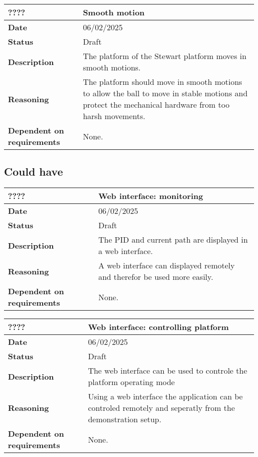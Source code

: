 \documentclass{article}
\begin{document}
\begin{table}[H]
    \renewcommand{\arraystretch}{1.3}
    \begin{tabular}{|l|p{10cm}|}
        \hline
        \rowcolor{gray!50}
        \textbf{????} & \textbf{Smooth motion} \\ \hline
        \textbf{Date} & 06/02/2025 \\ \hline
        \textbf{Status} & Draft \\ \hline
        \textbf{Description} & The platform of the Stewart platform moves in smooth motions. \\ \hline
        \textbf{Reasoning} & The platform should move in smooth motions to allow the ball to move in stable motions and protect the mechanical hardware from too harsh movements. \\ \hline
        \textbf{Dependent on requirements} & None. \\ \hline
    \end{tabular}
\end{table}

\subsection{Could have}

\begin{table}[H]
    \renewcommand{\arraystretch}{1.3}
    \begin{tabular}{|l|p{10cm}|}
        \hline
        \rowcolor{gray!50}
        \textbf{????} & \textbf{Web interface: monitoring} \\ \hline
        \textbf{Date} & 06/02/2025 \\ \hline
        \textbf{Status} & Draft \\ \hline
        \textbf{Description} & The PID and current path are displayed in a web interface.\\ \hline
        \textbf{Reasoning} & A web interface can displayed remotely and therefor be used more easily.\\ \hline
        \textbf{Dependent on requirements} & None. \\ \hline
    \end{tabular}
\end{table}
\begin{table}[H]
    \renewcommand{\arraystretch}{1.3}
    \begin{tabular}{|l|p{10cm}|}
        \hline
        \rowcolor{gray!50}
        \textbf{????} & \textbf{Web interface: controlling platform} \\ \hline
        \textbf{Date} & 06/02/2025 \\ \hline
        \textbf{Status} & Draft \\ \hline
        \textbf{Description} & The web interface can be used to controle the platform operating mode\\ \hline
        \textbf{Reasoning} & Using a web interface the application can be controled remotely and seperatly from the demonstration setup.\\ \hline
        \textbf{Dependent on requirements} & None. \\ \hline
    \end{tabular}
\end{table}
\end{document}
